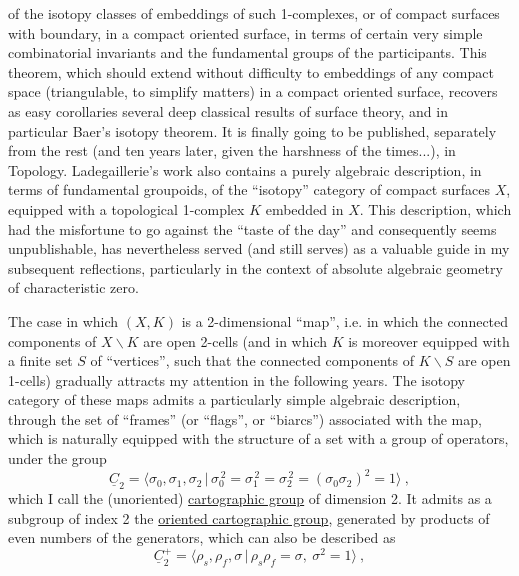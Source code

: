 
of the isotopy classes of embeddings of such 1-complexes,
or of compact surfaces with boundary, in a compact oriented surface,
in terms of certain very simple combinatorial invariants and the
fundamental groups of the participants. This theorem, which should
extend without difficulty to embeddings of any compact space
(triangulable, to simplify matters) in a compact oriented surface,
recovers as easy corollaries several deep classical results
of surface theory, and in particular Baer's isotopy theorem.
It is finally going to be published, separately from the rest (and
ten years later, given the harshness of the times...), in Topology. Ladegaillerie's
work also contains a purely algebraic description,
in terms of fundamental groupoids, of the
``isotopy'' category of compact surfaces $X$, equipped with a topological
1-complex $K$ embedded in $X$. This description, which had the misfortune
to go against the ``taste of the day'' and consequently seems unpublishable,
has nevertheless served (and still serves) as a valuable guide in
my subsequent reflections, particularly in the context of absolute
algebraic geometry of characteristic zero.

The case in which $(X,K)$ is a 2-dimensional ``map'',
i.e. in which the connected components of $X\backslash K$ are open 2-cells 
(and in which $K$ is moreover equipped with a finite set $S$ of ``vertices'',
such that the connected components of $K\backslash S$ are open 1-cells)
gradually attracts my attention in the following years.
The isotopy category of these maps admits a particularly
simple algebraic description, through the set of ``frames'' (or ``flags'',
or ``biarcs'') associated with the map, which is naturally equipped
with the structure of a set with a group of operators, under the group
\[ \underline{C}_2 = \langle \sigma_0,\sigma_1,\sigma_2 \,|\, \sigma_0^{\,2} = \sigma_1^{\,2} = \sigma_2^{\,2} = (\sigma_0\sigma_2)^2 = 1 \rangle \ , \]
which I call the (unoriented) \uline{cartographic group} of dimension 2.
It admits as a subgroup of index 2 the \uline{oriented cartographic group},
generated by products of even numbers of the generators, which can
also be described as
\[ \underline{C}_2^{+} = \langle \rho_s,\rho_f,\sigma \,|\, \rho_s\rho_f = \sigma,\ \sigma^2 = 1 \rangle \ , \]


